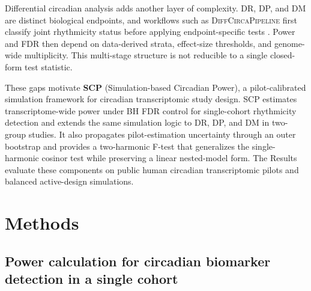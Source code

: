 \documentclass{article}
\begin{document}
Differential circadian analysis adds another layer of complexity. DR, DP, and DM are distinct biological endpoints, and workflows such as \textsc{DiffCircaPipeline} first classify joint rhythmicity status before applying endpoint-specific tests \citep{xue2023diffcircapipeline}. Power and FDR then depend on data-derived strata, effect-size thresholds, and genome-wide multiplicity. This multi-stage structure is not reducible to a single closed-form test statistic.

These gaps motivate \textbf{\textsc{SCP}} (Simulation-based Circadian Power), a pilot-calibrated simulation framework for circadian transcriptomic study design. \textsc{SCP} estimates transcriptome-wide power under BH FDR control for single-cohort rhythmicity detection and extends the same simulation logic to DR, DP, and DM in two-group studies. It also propagates pilot-estimation uncertainty through an outer bootstrap and provides a two-harmonic F-test that generalizes the single-harmonic cosinor test while preserving a linear nested-model form. The Results evaluate these components on public human circadian transcriptomic pilots and balanced active-design simulations.

\section{Methods}



\subsection{Power calculation for circadian biomarker detection in a single cohort}
\label{sec:single_cohort}
\end{document}
